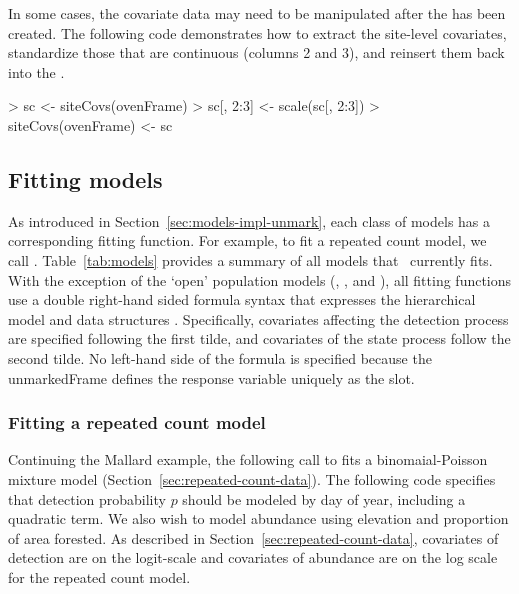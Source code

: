 \documentclass[article,shortnames]{jss}
\newcommand{\um}{\pkg{unmarked}}
\begin{document}
In some cases, the covariate data may need to be manipulated after the 
 has been created. The following code demonstrates 
how to extract the site-level covariates, standardize those that are 
continuous (columns 2 and 3), and reinsert them back into the 
.

\begin{Schunk}
\begin{Sinput}
> sc <- siteCovs(ovenFrame)
> sc[, 2:3] <- scale(sc[, 2:3])
> siteCovs(ovenFrame) <- sc
\end{Sinput}
\end{Schunk}



\subsection{Fitting models}
\label{sec:fitting-models}

As introduced in Section~\ref{sec:models-impl-unmark}, each class of models has a
corresponding fitting function.  For example, to fit a repeated count
model, we call .  Table~\ref{tab:models} provides a
summary of all models that \um\ currently fits.  With the exception of the 
`open' population models (, , and 
), all fitting functions use a double right-hand sided 
formula syntax that expresses the hierarchical model and data structures .  
Specifically, covariates affecting the detection process are specified 
following the first tilde, and covariates of the state process follow the 
second tilde. No left-hand side of the formula is specified because the 
unmarkedFrame defines the response variable uniquely as the  slot.

\subsubsection{Fitting a repeated count model}

Continuing the Mallard example, the following call to  fits a 
binomaial-Poisson mixture model (Section~\ref{sec:repeated-count-data}).  The 
following code specifies that detection probability $p$ should be modeled by 
day of year, including a quadratic term.  We also wish to model abundance 
using elevation and proportion of area forested.  As described in 
Section~\ref{sec:repeated-count-data}, covariates of detection are on the 
logit-scale and covariates of abundance are on the log scale for the 
repeated count model.
\end{document}
